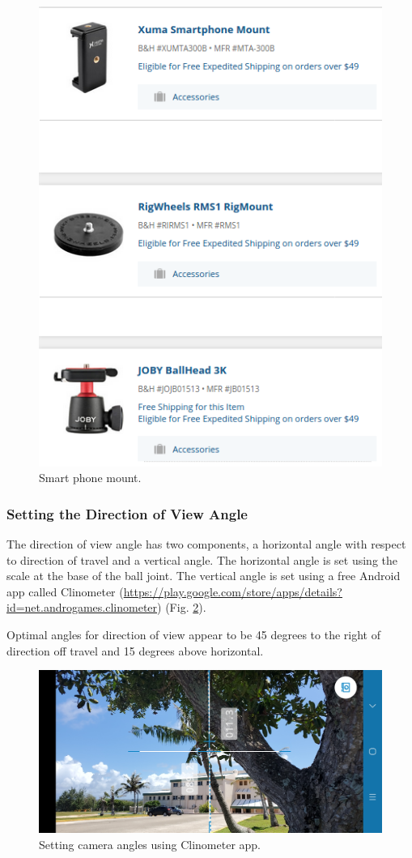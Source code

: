 \documentclass[12pt,letterpaper,english,bibliography=totocnumbered, abstract=on]{scrartcl}
\begin{document}
\begin{figure}[H]
	\centering
	\includegraphics[width=0.7\linewidth]{images/mount}
	\caption{Smart phone mount.}
	\label{fig:mount}
\end{figure}

\subsubsection{Setting the Direction of View Angle}

The direction of view angle has two components, a horizontal angle with respect to direction of travel and a vertical angle. The horizontal angle is set using the scale at the base of the ball joint. The vertical angle is set using a free Android app called Clinometer (\url{https://play.google.com/store/apps/details?id=net.androgames.clinometer}) (Fig. \ref{fig:clinometer}).  

Optimal angles for direction of view appear to be 45 degrees to the right of direction off travel and 15 degrees above horizontal.

\begin{figure}[H]
	\centering
	\includegraphics[width=0.7\linewidth]{images/clinometer}
	\caption{Setting camera angles using Clinometer app.}
	\label{fig:clinometer}
\end{figure}
\end{document}
